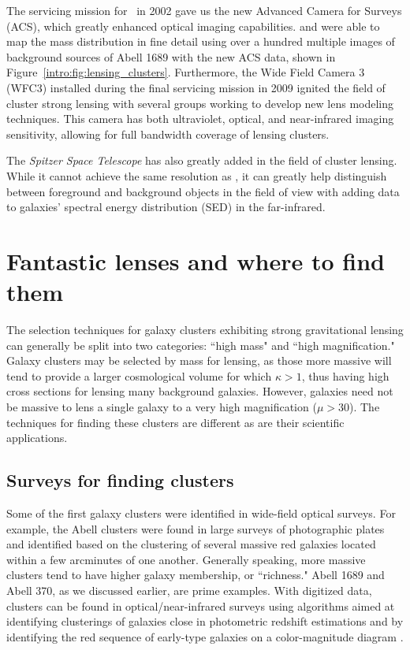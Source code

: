 The servicing mission for \hst\ in 2002 gave us the new Advanced Camera for Surveys (ACS), which greatly enhanced optical imaging capabilities. \citet{Broadhurst:2005qy} and \citet{Halkola:2006ss} were able to map the mass distribution in fine detail using over a hundred multiple images of background sources of Abell 1689 with the new ACS data, shown in Figure~\ref{intro:fig:lensing_clusters}. Furthermore, the Wide Field Camera 3 (WFC3) installed during the final servicing mission in 2009 ignited the field of cluster strong lensing with several groups working to develop new lens modeling techniques. This camera has both ultraviolet, optical, and near-infrared imaging sensitivity, allowing for full bandwidth coverage of lensing clusters.

The {\it Spitzer Space Telescope} has also greatly added in the field of cluster lensing. While it cannot achieve the same resolution as \hst, it can greatly help distinguish between foreground and background objects in the field of view with adding data to galaxies' spectral energy distribution (SED) in the far-infrared.

\section{Fantastic lenses and where to find them}

The selection techniques for galaxy clusters exhibiting strong gravitational lensing can generally be split into two categories: ``high mass" and ``high magnification." Galaxy clusters may be selected by mass for lensing, as those more massive will tend to provide a larger cosmological volume for which $\kappa>1$, thus having high cross sections for lensing many background galaxies. However, galaxies need not be massive to lens a single galaxy to a very high magnification ($\mu>30$). The techniques for finding these clusters are different as are their scientific applications.

\subsection{Surveys for finding clusters}

Some of the first galaxy clusters were identified in wide-field optical surveys. For example, the Abell clusters \citep{Abell:1958mz,Zwicky:1968rm,Abell:1989ly} were found in large surveys of photographic plates and identified based on the clustering of several massive red galaxies located within a few arcminutes of one another. Generally speaking, more massive clusters tend to have higher galaxy membership, or ``richness." Abell 1689 and Abell 370, as we discussed earlier, are prime examples. With digitized data, clusters can be found in optical/near-infrared surveys using algorithms aimed at identifying clusterings of galaxies close in photometric redshift estimations \citep{Rykoff:2014rz} and by identifying the red sequence of early-type galaxies on a color-magnitude diagram \citep{Gladders:2000kq}.

